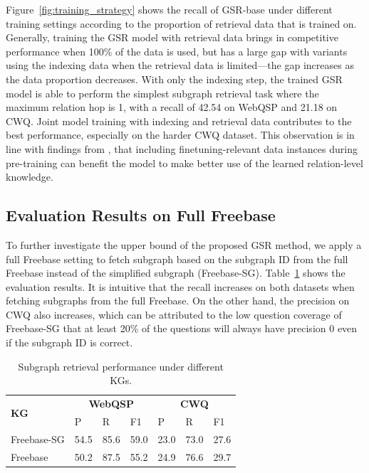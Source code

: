 \documentclass[11pt]{article}
\begin{document}
Figure~\ref{fig:training_strategy} shows the recall of GSR-base under different training settings according to the proportion of retrieval data that is trained on. Generally, training the GSR model with retrieval data brings in competitive performance when 100\% of the data is used, but has a large gap with variants using the indexing data when the retrieval data is limited---the gap increases as the data proportion decreases. With only the indexing step, the trained GSR model is able to perform the simplest subgraph retrieval task where the maximum relation hop is 1, with a recall of 42.54 on WebQSP and 21.18 on CWQ. Joint model training with indexing and retrieval data contributes to the best performance, especially on the harder CWQ dataset. This observation is in line with findings from \citet{allenzhu2023physics}, that including finetuning-relevant data instances during pre-training can benefit the model to make better use of the learned relation-level knowledge.

\subsection{Evaluation Results on Full Freebase}
\label{sec:rq4}
To further investigate the upper bound of the proposed GSR method, we apply a full Freebase setting to fetch subgraph based on the subgraph ID from the full Freebase instead of the simplified subgraph (Freebase-SG). Table~\ref{tab:full_res} shows the evaluation results. It is intuitive that the recall increases on both datasets when fetching subgraphs from the full Freebase. On the other hand, the precision on CWQ also increases, which can be attributed to the low question coverage of Freebase-SG that at least 20\% of the questions will always have precision 0 even if the subgraph ID is correct. 
\begin{table}[]
    \centering    \small
    \begin{tabular}{l|p{0.5cm}p{0.5cm}p{0.6cm}|p{0.5cm}p{0.5cm}p{0.5cm}}
    \toprule
        \multirow{2}{*}{\bf{KG}} & \multicolumn{3}{c}{\bf{WebQSP}} & \multicolumn{3}{|c}{\bf{CWQ}} \\ 
        & P & R & F1 & P & R & F1 \\ \midrule
        Freebase-SG & 54.5 & 85.6 & 59.0 & 23.0 & 73.0 & 27.6 \\
        Freebase & 50.2 & 87.5 & 55.2 & 24.9 & 76.6 & 29.7 \\ %
        \bottomrule
    \end{tabular}
    \caption{Subgraph retrieval performance under different KGs.}
    \label{tab:full_res}
\end{table}
\end{document}
